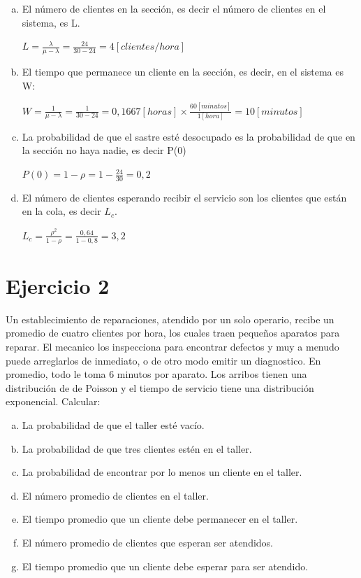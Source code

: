 \documentclass[a4paper,11pt]{article}
\begin{document}
\begin{enumerate}[a)]
  \vspace{13pt}
  \item El número de clientes en la sección, es decir el número de clientes en
    el sistema, es L.

  $L = \frac{\lambda}{\mu - \lambda} = \frac{24}{30 - 24} = 4 [clientes/hora]$

  \vspace{13pt}
  \item El tiempo que permanece un cliente en la sección, es decir, en el
    sistema es W:

  $W = \frac{1}{\mu-\lambda} = \frac{1}{30-24} = 0,1667[horas] \times \frac{60[minutos]}{1[hora]} = 10[minutos]$

  \vspace{13pt}
  \item La probabilidad de que el sastre esté desocupado es la probabilidad de
    que en la sección no haya nadie, es decir P(0)

  $P(0) = 1-\rho = 1-\frac{24}{30} = 0,2$

  \vspace{13pt}
  \item El número de clientes esperando recibir el servicio son los clientes
    que están en la cola, es decir $L_c$.

  $L_c = \frac{\rho^2}{1-\rho} = \frac{0,64}{1-0,8} = 3,2$

\end{enumerate}
\vspace{35pt}
\section{\textbf{Ejercicio 2}}

Un establecimiento de reparaciones, atendido por un solo operario, recibe un
promedio de cuatro clientes por hora, los cuales traen pequeños aparatos para
reparar.  El mecanico los inspecciona para encontrar defectos y muy a menudo
puede arreglarlos de inmediato, o de otro modo emitir un diagnostico. En
promedio, todo le toma 6 minutos por aparato. Los arribos tienen una
distribución de de Poisson y el tiempo de servicio tiene una distribución
exponencial. Calcular:

\leftskip=36pt
\parindent=-18pt
\begin{enumerate}[a)]
  \item La probabilidad de que el taller esté vacío.
  \item La probabilidad de que tres clientes estén en el taller.
  \item La probabilidad de encontrar por lo menos un cliente en el taller.
  \item El número promedio de clientes en el taller.
  \item El tiempo promedio que un cliente debe permanecer en el taller.
  \item El número promedio de clientes que esperan ser atendidos.
  \item El tiempo promedio que un cliente debe esperar para ser atendido.
\end{enumerate}
\end{document}
